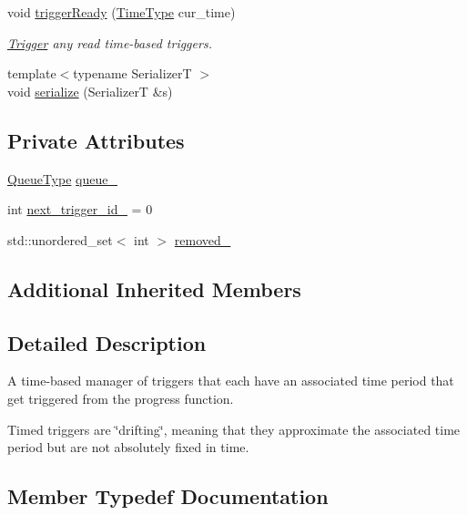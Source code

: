 \begin{DoxyCompactItemize}
void \hyperlink{structvt_1_1timetrigger_1_1_time_trigger_manager_a57c2be01d872ed68e2261786468e3979}{trigger\+Ready} (\hyperlink{namespacevt_a876a9d0cd5a952859c72de8a46881442}{Time\+Type} cur\+\_\+time)
\begin{DoxyCompactList}\small\item\em \hyperlink{structvt_1_1timetrigger_1_1_trigger}{Trigger} any read time-\/based triggers. \end{DoxyCompactList}\item 
{\footnotesize template$<$typename SerializerT $>$ }\\void \hyperlink{structvt_1_1timetrigger_1_1_time_trigger_manager_a2ae1e322a7f8ad4799060158c43acf27}{serialize} (SerializerT \&s)
\end{DoxyCompactItemize}
\subsection*{Private Attributes}
\begin{DoxyCompactItemize}
\item 
\hyperlink{structvt_1_1timetrigger_1_1_time_trigger_manager_ad5dc7eeeb4b0d12a5582544d8f0a08c8}{Queue\+Type} \hyperlink{structvt_1_1timetrigger_1_1_time_trigger_manager_aa7a4a5f115644540035596b1057e2ac2}{queue\+\_\+}
\item 
int \hyperlink{structvt_1_1timetrigger_1_1_time_trigger_manager_a97d23d2d8ae1bafe79456c68db0d5b26}{next\+\_\+trigger\+\_\+id\+\_\+} = 0
\item 
std\+::unordered\+\_\+set$<$ int $>$ \hyperlink{structvt_1_1timetrigger_1_1_time_trigger_manager_aac6dda4fd78e5338f6bec56b75e038cd}{removed\+\_\+}
\end{DoxyCompactItemize}
\subsection*{Additional Inherited Members}


\subsection{Detailed Description}
A time-\/based manager of triggers that each have an associated time period that get triggered from the progress function. 

Timed triggers are \char`\"{}drifting\char`\"{}, meaning that they approximate the associated time period but are not absolutely fixed in time. 

\subsection{Member Typedef Documentation}
\mbox{\label{structvt_1_1timetrigger_1_1_time_trigger_manager_ad5dc7eeeb4b0d12a5582544d8f0a08c8}} 
